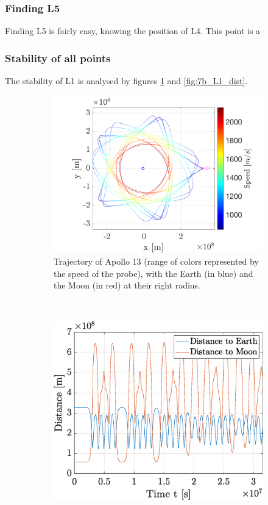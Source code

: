 \documentclass[a4paper,12pt,twoside]{article}
\begin{document}
\subsubsection{Finding L5}
Finding L5 is fairly easy, knowing the position of L4.
This point is a

\subsubsection{Stability of all points}
The stability of L1 is analysed by figures \ref{fig:7b_L1_traj} and \ref{fig:7b_L1_dist}.

\begin{figure}[h]
  \centering
  \begin{subfigure}[t]{0.55\textwidth}
    \includegraphics[width=\textwidth]{graphs/ex7b_L1_traj.png}
    \caption{Trajectory of Apollo 13 (range of colors represented by the speed of the probe), with the Earth (in blue) and the Moon (in red) at their right radius.}
    \label{fig:7b_L1_traj}
  \end{subfigure}
  ~
  \begin{subfigure}[t]{0.4\textwidth}
    \includegraphics[width=\textwidth]{graphs/ex7b_L1_dist.eps}

\end{subfigure}
\end{figure}
\end{document}
